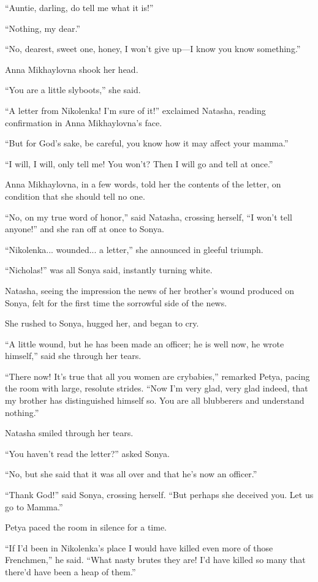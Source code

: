 ``Auntie, darling, do tell me what it is!''

``Nothing, my dear.''

``No, dearest, sweet one, honey, I won't give up---I know you
know something.''

Anna Mikhaylovna shook her head.

``You are a little slyboots,'' she said.

``A letter from Nikolenka! I'm sure of it!'' exclaimed Natasha,
reading confirmation in Anna Mikhaylovna's face.

``But for God's sake, be careful, you know how it may affect your
mamma.''

``I will, I will, only tell me! You won't? Then I will go and
tell at once.''

Anna Mikhaylovna, in a few words, told her the contents of the
letter, on condition that she should tell no one.

``No, on my true word of honor,'' said Natasha, crossing herself,
``I won't tell anyone!'' and she ran off at once to Sonya.

``Nikolenka... wounded... a letter,'' she announced in gleeful
triumph.

``Nicholas!'' was all Sonya said, instantly turning white.

Natasha, seeing the impression the news of her brother's wound
produced on Sonya, felt for the first time the sorrowful side of
the news.

She rushed to Sonya, hugged her, and began to cry.

``A little wound, but he has been made an officer; he is well
now, he wrote himself,'' said she through her tears.

``There now! It's true that all you women are crybabies,''
remarked Petya, pacing the room with large, resolute
strides. ``Now I'm very glad, very glad indeed, that my brother
has distinguished himself so. You are all blubberers and
understand nothing.''

Natasha smiled through her tears.

``You haven't read the letter?'' asked Sonya.

``No, but she said that it was all over and that he's now an
officer.''

``Thank God!'' said Sonya, crossing herself. ``But perhaps she
deceived you. Let us go to Mamma.''

Petya paced the room in silence for a time.

``If I'd been in Nikolenka's place I would have killed even more
of those Frenchmen,'' he said. ``What nasty brutes they are! I'd
have killed so many that there'd have been a heap of them.''

